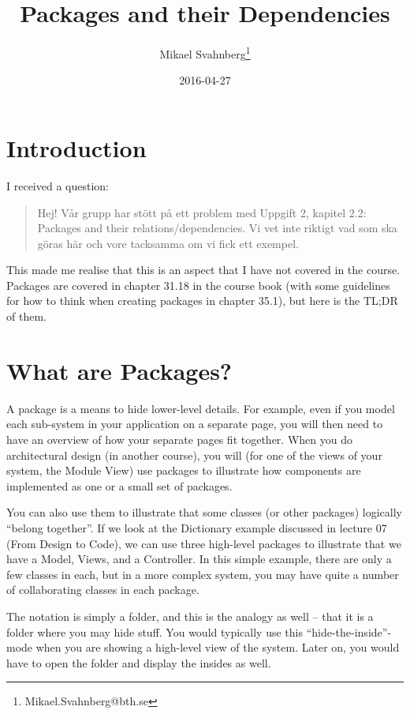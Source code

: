 \documentclass[10pt,t,a4paper]{article}
\author{Mikael Svahnberg\thanks{Mikael.Svahnberg@bth.se}}
\date{2016-04-27}
\title{Packages and their Dependencies}
\begin{document}
\maketitle

\section{Introduction}
\label{sec:orgheadline1}
I received a question:

\begin{quote}
Hej! Vår grupp har stött på ett problem med Uppgift 2, kapitel 2.2: Packages and their relations/dependencies.
Vi vet inte riktigt vad som ska göras här och vore tacksamma om vi fick ett exempel.
\end{quote}

This made me realise that this is an aspect that I have not covered in the course. Packages are covered in chapter 31.18 in the course book (with some guidelines for how to think when creating packages in chapter 35.1), but here is the TL;DR of them.

\section{What are Packages?}
\label{sec:orgheadline6}
A package is a means to hide lower-level details. For example, even if you model each sub-system in your application on a separate page, you will then need to have an overview of how your separate pages fit together. When you do architectural design (in another course), you will (for one of the views of your system, the Module View) use packages to illustrate how components are implemented as one or a small set of packages.

You can also use them to illustrate that some classes (or other packages) logically ``belong together''. If we look at the Dictionary example discussed in lecture 07 (From Design to Code), we can use three high-level packages to illustrate that we have a Model, Views, and a Controller. In this simple example, there are only a few classes in each, but in a more complex system, you may have quite a number of collaborating classes in each package.

The notation is simply a folder, and this is the analogy as well -- that it is a folder where you may hide stuff. You would typically use this ``hide-the-inside''-mode when you are showing a high-level view of the system. Later on, you would have to open the folder and display the insides as well.
\end{document}

